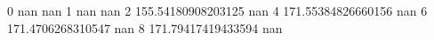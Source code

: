 0 nan nan
1 nan nan
2 155.54180908203125 nan
4 171.55384826660156 nan
6 171.4706268310547 nan
8 171.79417419433594 nan

